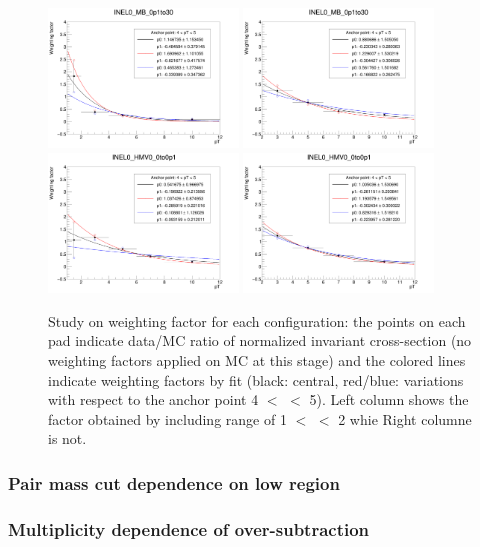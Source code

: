 \begin{figure}[t]
    \includegraphics[width=0.45\textwidth]{plots/s2_pTW1to12_INEL0_MB_0p1to30.png}
    \includegraphics[width=0.45\textwidth]{plots/s2_pTW2to12_INEL0_MB_0p1to30.png}
    \includegraphics[width=0.45\textwidth]{plots/s2_pTW1to12_INEL0_HMV0_0to0p1.png}
    \includegraphics[width=0.45\textwidth]{plots/s2_pTW2to12_INEL0_HMV0_0to0p1.png}
    \caption{Study on weighting factor for each configuration: the points on each pad indicate data/MC ratio of normalized invariant cross-section (no weighting factors applied on MC at this stage) and the colored lines indicate weighting factors by fit (black: central, red/blue: variations with respect to the anchor point 4 $<$ \pt $<$ 5). Left column shows the factor obtained by including \pt range of 1 $<$ \pt $<$ 2 whie Right columne is not.}
    \label{fig:s2_pTW}
\end{figure}

\clearpage
\subsubsection{Pair mass cut dependence on low \pt region}

\subsubsection{Multiplicity dependence of \Xib over-subtraction}
